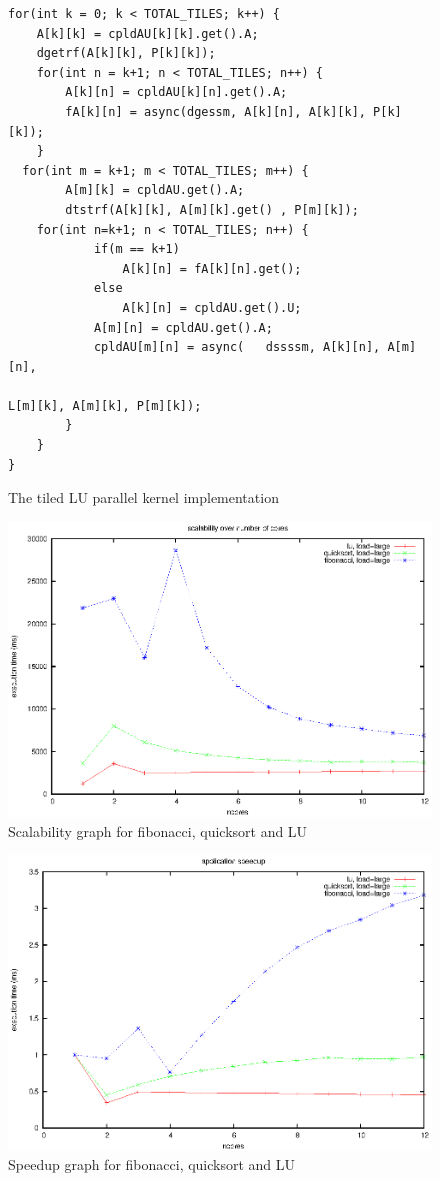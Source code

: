 \begin{figure}[!ht]
\begin{lstlisting}
for(int k = 0; k < TOTAL_TILES; k++) {
	A[k][k] = cpldAU[k][k].get().A;
	dgetrf(A[k][k], P[k][k]);
	for(int n = k+1; n < TOTAL_TILES; n++) {
		A[k][n] = cpldAU[k][n].get().A;
		fA[k][n] = async(dgessm, A[k][n], A[k][k], P[k][k]);
	}
  for(int m = k+1; m < TOTAL_TILES; m++) {
		A[m][k] = cpldAU.get().A;
		dtstrf(A[k][k], A[m][k].get() , P[m][k]);
  	for(int n=k+1; n < TOTAL_TILES; n++) {
			if(m == k+1)
				A[k][n] = fA[k][n].get();
			else
				A[k][n] = cpldAU.get().U;
			A[m][n] = cpldAU.get().A;
			cpldAU[m][n] = async(	dssssm, A[k][n], A[m][n], 
														L[m][k], A[m][k], P[m][k]);
		}
	}
}

\end{lstlisting}
\caption{The tiled LU parallel kernel implementation}
\label{lst:tiledLUpar}
\end{figure}

\begin{figure}[!ht]
\includegraphics[width=0.7\columnwidth]{figures/apps_scalability}
\caption{Scalability graph for fibonacci, quicksort and LU}
\label{fig:apps_scalability}
\end{figure}

\begin{figure}[!ht]
\includegraphics[width=0.7\columnwidth]{figures/apps_speedup}
\caption{Speedup graph for fibonacci, quicksort and LU}
\label{fig:apps_speedup}
\end{figure}

